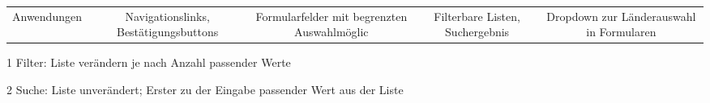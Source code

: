 \begin{table}[ht!]
\begin{threeparttable}
\begin{tabular}{ l || c | c | c | c }
                \hline
                Anwendungen & Navigationslinks, Bestätigungsbuttons & Formularfelder mit begrenzten Auswahlmöglic & Filterbare Listen, Suchergebnis & Dropdown zur Länderauswahl in Formularen \\
            \end{tabular}
            \begin{tablenotes}
                \scriptsize
                \item[1] Filter: Liste verändern je nach Anzahl passender Werte
                \item[2] Suche: Liste unverändert; Erster zu der Eingabe passender Wert aus der Liste     
            \end{tablenotes}
        \end{threeparttable}
\end{table}